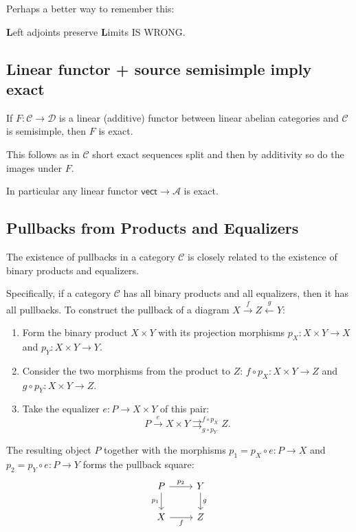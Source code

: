 \documentclass[11pt]{article}
\newcommand{\cat}[1]{\mathcal{#1}}
\theoremstyle{definition}
\begin{document}
Perhaps a better way to remember this: 

\begin{center}
\textbf{L}eft adjoints preserve\textbf{ L}imits IS WRONG.
\end{center} 


\subsection{Linear functor + source semisimple imply exact}


If $F: \mathcal{C} \to \cat{D}$ is a linear (additive) functor between linear abelian categories and $\cat{C}$ is semisimple, then $F$ is exact.

This follows as in $\cat{C}$ short exact sequences split and then by additivity so do the images under $F$.


In particular any linear functor $\mathsf{vect} \to \cat{A}$ is exact.

\subsection{Pullbacks from Products and Equalizers}
The existence of pullbacks in a category $\mathcal{C}$ is closely related to the existence of binary products and equalizers.

Specifically, if a category $\mathcal{C}$ has all binary products and all equalizers, then it has all pullbacks. To construct the pullback of a diagram $X \xrightarrow{f} Z \xleftarrow{g} Y$:
\begin{enumerate}
    \item Form the binary product $X \times Y$ with its projection morphisms $p_X: X \times Y \to X$ and $p_Y: X \times Y \to Y$.
    \item Consider the two morphisms from the product to $Z$: $f \circ p_X : X \times Y \to Z$ and $g \circ p_Y : X \times Y \to Z$.
    \item Take the equalizer $e: P \to X \times Y$ of this pair:
    \[
    P \xrightarrow{e} X \times Y \rightrightarrows^{f \circ p_X}_{g \circ p_Y} Z.
    \]
\end{enumerate}
The resulting object $P$ together with the morphisms $p_1 = p_X \circ e : P \to X$ and $p_2 = p_Y \circ e : P \to Y$ forms the pullback square:
\[
\begin{tikzcd}
P \arrow[r, "p_2"] \arrow[d, "p_1"'] & Y \arrow[d, "g"] \\
X \arrow[r, "f"'] & Z
\end{tikzcd}
\]
\end{document}
